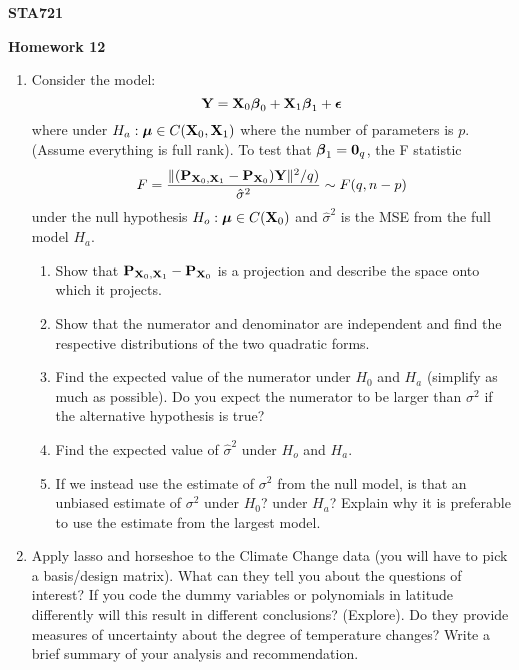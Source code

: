 \documentclass[12pt]{article}
\begin{document}
{\bf STA721  }
\vspace{.1in}
\begin{center}
{\large \bf Homework 12} \\
\end{center}
\vspace{.5in}
\noindent

\begin{enumerate}

\item Consider the model: $$\mathbf{Y} = \mathbf{X}_0 \boldsymbol{\beta}_0 + \mathbf{X}_1 \boldsymbol{\beta}_1 + \boldsymbol{\epsilon}$$
where under $H_a:  \boldsymbol{\mu} \in C(\mathbf{X}_0, \mathbf{X}_1)$  where the number of
parameters is $p$.  (Assume everything is full rank).
To test that $\boldsymbol{\beta}_1 = \mathbf{0}_q$,
the F statistic
$$F =  \frac{\| (\mathbf{P}_{\mathbf{X}_0,\mathbf{X}_1} - \mathbf{P}_{\mathbf{X}_0} )\mathbf{Y} \|^2 /q) }
{\hat{\sigma}^2} \sim F( q,  n - p)$$
under the null hypothesis $H_o: \boldsymbol{\mu} \in C(\mathbf{X}_0)$ and $\hat{\sigma}^2$ is
the MSE from the full model  $H_a$.

\begin{enumerate}
\item Show that $\mathbf{P}_{\mathbf{X}_0,\mathbf{X}_1} - \mathbf{P}_{\mathbf{X}_0}$ is a projection and
  describe the space onto which it projects.
\item Show that the numerator and denominator are independent and find
  the respective distributions of the two quadratic forms.
\item Find the expected value of the numerator under $H_0$ and $H_a$ (simplify
  as much as possible).   Do you expect the numerator to be larger
  than $\sigma^2$ if the alternative hypothesis is true?
\item Find the expected value of $\hat{\sigma}^2$ under $H_o$ and
  $H_a$.
\item If we instead use the estimate of $\sigma^2$ from the null
  model,  is that an unbiased estimate of $\sigma^2$ under $H_0$?
  under $H_a$?  Explain why it is preferable to use the estimate from
  the largest model. 

\end{enumerate}

\item Apply lasso and horseshoe to the Climate Change data (you will
  have to pick a basis/design matrix).  What can they tell you about
  the questions of interest?  If you code the dummy variables or
  polynomials in latitude differently will this result in different
  conclusions? (Explore). Do they provide measures of uncertainty
  about the degree of temperature changes?   Write a
  brief summary of your analysis and recommendation.
 
\end{enumerate}
\end{document}
